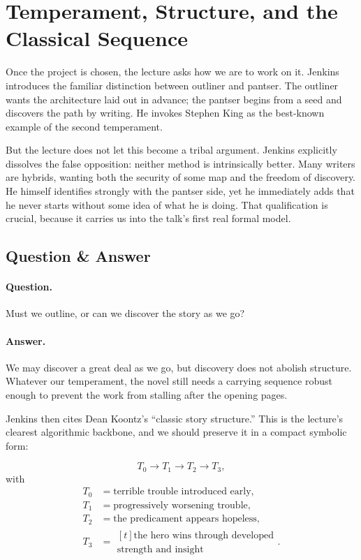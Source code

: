 \section{Temperament, Structure, and the Classical Sequence}

Once the project is chosen, the lecture asks how we are to work on it. Jenkins introduces the familiar distinction between outliner and pantser. The outliner wants the architecture laid out in advance; the pantser begins from a seed and discovers the path by writing. He invokes Stephen King as the best-known example of the second temperament.

But the lecture does not let this become a tribal argument. Jenkins explicitly dissolves the false opposition: neither method is intrinsically better. Many writers are hybrids, wanting both the security of some map and the freedom of discovery. He himself identifies strongly with the pantser side, yet he immediately adds that he never starts without some idea of what he is doing. That qualification is crucial, because it carries us into the talk's first real formal model.

\subsection{Question \& Answer}

\paragraph{Question.} Must we outline, or can we discover the story as we go?

\paragraph{Answer.} We may discover a great deal as we go, but discovery does not abolish structure. Whatever our temperament, the novel still needs a carrying sequence robust enough to prevent the work from stalling after the opening pages.

Jenkins then cites Dean Koontz's ``classic story structure.'' This is the lecture's clearest algorithmic backbone, and we should preserve it in a compact symbolic form:

\begin{equation}
T_0 \to T_1 \to T_2 \to T_3,
\end{equation}
with
\begin{align}
T_0&=\text{terrible trouble introduced early},\\
T_1&=\text{progressively worsening trouble},\\
T_2&=\text{the predicament appears hopeless},\\
T_3&=
\begin{aligned}[t]
\text{the hero wins through developed} \\
\text{strength and insight}
\end{aligned}.
\end{align}

